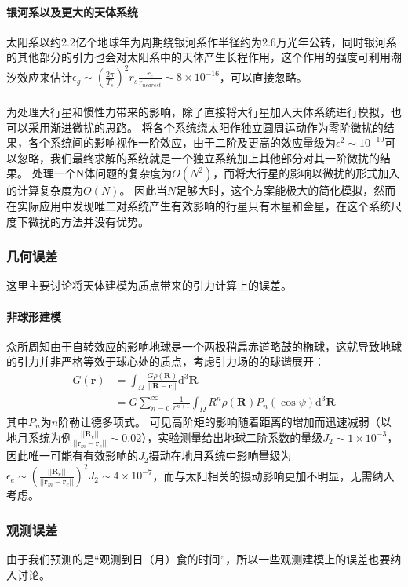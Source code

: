 \documentclass[hidelinks]{article}
\begin{document}
\paragraph{银河系以及更大的天体系统}
太阳系以约2.2亿个地球年为周期绕银河系作半径约为2.6万光年公转，同时银河系的其他部分的引力也会对太阳系中的天体产生长程作用，这个作用的强度可利用潮汐效应来估计$\epsilon_g\sim(\frac{2\pi}{T_s})^2r_s\frac{r_e}{r_{nearest}}\sim8\times10^{-16}$，可以直接忽略。
\label{object_error}
\\
\\
为处理大行星和惯性力带来的影响，除了直接将大行星加入天体系统进行模拟，也可以采用渐进微扰的思路。
将各个系统绕太阳作独立圆周运动作为零阶微扰的结果，各个系统间的影响视作一阶效应，由于二阶及更高的效应量级为$\epsilon^2\sim10^{-10}$可以忽略，我们最终求解的系统就是一个独立系统加上其他部分对其一阶微扰的结果。
处理一个N体问题的复杂度为$O(N^2)$，而将大行星的影响以微扰的形式加入的计算复杂度为$O(N)$。
因此当$N$足够大时，这个方案能极大的简化模拟，然而在实际应用中发现唯二对系统产生有效影响的行星只有木星和金星，在这个系统尺度下微扰的方法并没有优势。
\subsubsection{几何误差}
这里主要讨论将天体建模为质点带来的引力计算上的误差。
\paragraph{非球形建模}众所周知由于自转效应的影响地球是一个两极稍扁赤道略鼓的椭球，这就导致地球的引力并非严格等效于球心处的质点，考虑引力场的的球谐展开：
\begin{align*}
    G(\mathbf{r})&=\int_{\Omega}\frac{G\rho(\mathbf{R})}{||\mathbf{R}-\mathbf{r}||}\mathrm{d}^3\mathbf{R}\\
    &=G\sum_{n=0}^\infty\frac{1}{r^{n+1}}\int_\Omega R^n\rho(\mathbf{R})P_n(\cos{\psi})\mathrm{d}^3\mathbf{R}
\end{align*}
其中$P_n$为$n$阶勒让德多项式。
可见高阶矩的影响随着距离的增加而迅速减弱（以地月系统为例$\frac{||\mathbf{R}_e||}{||\mathbf{r}_m-\mathbf{r}_e||}\sim0.02$），实验测量给出地球二阶系数的量级$J_2\sim1\times10^{-3}$，因此唯一可能有有效影响的$J_2$摄动在地月系统中影响量级为$\epsilon_e\sim(\frac{||\mathbf{R}_e||}{||\mathbf{r}_m-\mathbf{r}_e||})^2J_2\sim4\times10^{-7}$，而与太阳相关的摄动影响更加不明显，无需纳入考虑。
\subsubsection{观测误差}
由于我们预测的是“观测到日（月）食的时间”，所以一些观测建模上的误差也要纳入讨论。
\end{document}
